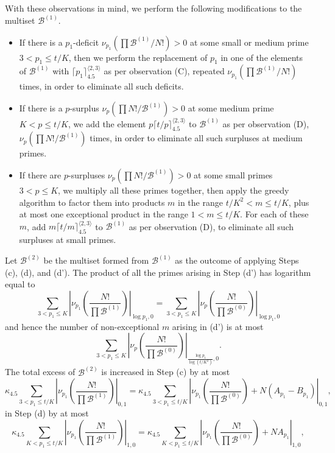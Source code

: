 \documentclass[10pt,a4paper,reqno]{amsart}
\numberwithin{equation}{section}
\theoremstyle{plain}
\theoremstyle{definition}
\newcommand\tuple{{\mathcal B}}
\begin{document}
With these observations in mind, we perform the following modifications to the multiset $\tuple^{(1)}$.
\begin{itemize}
\item[(c)] If there is a $p_1$-deficit $\nu_{p_1}(\prod \tuple^{(1)}/N!) > 0$ at some small or medium prime $3 < p_1 \leq t/K$, then we perform the replacement of $p_1$ in one of the elements of $\tuple^{(1)}$ with $\lceil p_1 \rceil^{\langle 2,3\rangle}_{4.5}$ as per observation (C), repeated $\nu_{p_1}(\prod \tuple^{(1)}/N!)$ times, in order to eliminate all such deficits.
\item[(d)] If there is a $p$-surplus $\nu_p(\prod N!/\tuple^{(1)}) > 0$ at some medium prime $K < p \leq t/K$, we add the element
$p \lceil t/p \rceil^{\langle 2,3 \rangle}_{4.5}$ to $\tuple^{(1)}$ as per observation (D), $\nu_p(\prod N!/\tuple^{(1)})$ times, in order to eliminate all such surpluses at medium primes.
\item[(d')] If there are $p$-surpluses $\nu_p(\prod N!/\tuple^{(1)}) > 0$ at some small primes $3 < p \leq K$, we multiply all these primes together, then apply the greedy algorithm to factor them into products $m$ in the range $t/K^2 < m \leq t/K$, plus at most one exceptional product in the range $1 < m \leq t/K$.  For each of these $m$, add $m \lceil t/m \rceil^{\langle 2,3 \rangle}_{4.5}$ to $\tuple^{(1)}$ as per observation (D), to eliminate all such surpluses at small primes.
\end{itemize}
Let $\tuple^{(2)}$ be the multiset formed from $\tuple^{(1)}$ as the outcome of applying Steps (c), (d), and (d').  The product of all the primes arising in Step (d') has logarithm equal to
$$ \sum_{3 < p_1 \leq K} \left|\nu_{p_1}\left( \frac{N!}{\prod \tuple^{(1)}} \right) \right|_{\log p_1,0} = \sum_{3 < p_1 \leq K} \left|\nu_p\left( \frac{N!}{\prod \tuple^{(0)}} \right) \right|_{\log p_1,0}$$
and hence the number of non-exceptional $m$ arising in (d') is at most
$$ \sum_{3 < p_1 \leq K} \left|\nu_p\left( \frac{N!}{\prod \tuple^{(0)}} \right) \right|_{\frac{\log p_1}{\log(t/K^2)},0}.$$
The total excess of $\tuple^{(2)}$ is increased in Step (c) by at most
$$ \kappa_{4.5} \sum_{3 < p_1 \leq t/K} \left|\nu_{p_1}\left( \frac{N!}{\prod \tuple^{(1)}} \right) \right|_{0,1}
=  \kappa_{4.5} \sum_{3 < p_1 \leq t/K} \left|\nu_{p_1}\left( \frac{N!}{\prod \tuple^{(0)}} \right) + N(A_{p_1} - B_{p_1}) \right|_{0,1},$$
in Step (d) by at most
$$ \kappa_{4.5} \sum_{K < p_1 \leq t/K} \left|\nu_{p_1}\left( \frac{N!}{\prod \tuple^{(1)}} \right) \right|_{1,0}
=  \kappa_{4.5} \sum_{K < p_1 \leq t/K} \left|\nu_{p_1}\left( \frac{N!}{\prod \tuple^{(0)}} \right) + NA_{p_1} \right|_{1,0},$$
\end{document}
